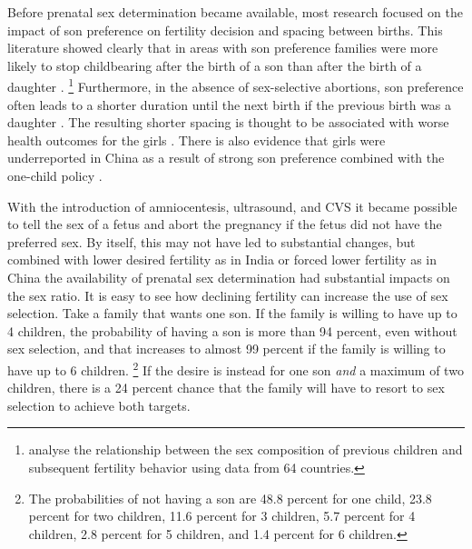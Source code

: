 \documentclass[letterpaper,12pt]{article}
\begin{document}
Before prenatal sex determination became available, most
research focused on the impact of son preference on
fertility decision and spacing between births.
This literature showed clearly that in areas with son preference families were 
more likely to stop  childbearing after the birth of a son than after the birth 
of a daughter \citep[see, for example,][]{Das1987,Arnold1997,clark00}.%
\footnote{
\citet{filmer09} analyse the relationship between the sex composition of previous
children and subsequent fertility behavior using data from 64 countries.
}
Furthermore, in the absence of sex-selective abortions, son preference 
often leads to a shorter duration until the next birth if the previous 
birth was a daughter 
\citep[see, for example,][]{Das1987,Rahman1993,Pong1994,Haughton1996,Arnold1997}.
The resulting shorter spacing is thought to be associated with worse 
health outcomes for the girls 
\citep{arnold98,Whitworth2002,Rutstein2005,Conde-Agudelo2006}.
There is also evidence that girls were underreported in China
as a result of strong son preference combined with the one-child
policy \citep{merli00}.

With the introduction of amniocentesis, ultrasound, and CVS it became
possible to tell the sex of a fetus and abort the pregnancy if the
fetus did not have the preferred sex. 
By itself, this may not have led to substantial changes, but combined
with lower desired fertility as in India or forced lower fertility
as in China the availability of prenatal sex determination had 
substantial impacts on the sex ratio.
It is easy to see how declining fertility can increase the use of sex selection.
Take a family that wants one son.
If the family is willing to have up to 4 children, the probability of having a son
is more than 94 percent, even without sex selection, and that increases to almost 99 
percent if the family is willing to have up to 6 children.%
\footnote{
The probabilities of not having a son are 48.8 percent for one child, 23.8 percent for
two children, 11.6 percent for 3 children, 5.7 percent for 4 children, 2.8 percent
for 5 children, and 1.4 percent for 6 children.
}
If the desire is instead for one son \emph{and} a maximum of two children, there 
is a 24 percent chance that the family will have to resort to sex selection to achieve 
both targets.
\end{document}

